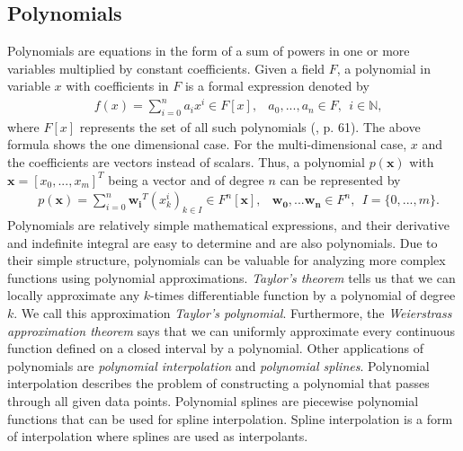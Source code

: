 \subsection{Polynomials}
Polynomials are equations in the form of a sum of powers in one or more variables multiplied by constant coefficients. Given a field $F$, a polynomial in variable $x$ with coefficients in $F$ is a formal expression denoted by
\begin{align*}
  &f(x) = \sum_{i=0}^{n} a_i x^i \in F[x], &a_0, ..., a_n \in F, \ \ i \in \mathbb{N},
\end{align*}
where $F[x]$ represents the set of all such polynomials (\cite{fischer2014}, p. 61). The above formula shows the one dimensional case. For the multi-dimensional case, $x$ and the coefficients are vectors instead of scalars. Thus, a polynomial $p(\mathbf{x})$ with $\mathbf{x} = [x_0, ..., x_m]^T$ being a vector and of degree $n$ can be represented by
\begin{align*}
  &p(\mathbf{x}) = \sum_{i=0}^{n} \mathbf{w_i}^T (x_k^i)_{k \in I} \in F^n[\mathbf{x}], &\mathbf{w_0}, ... \mathbf{w_n} \in F^n, \ \ I = \{0, ..., m\}.
\end{align*}
Polynomials are relatively simple mathematical expressions, and their derivative and indefinite integral are easy to determine and are also polynomials. Due to their simple structure, polynomials can be valuable for analyzing more complex functions using polynomial approximations. \textit{Taylor's theorem} tells us that we can locally approximate any $k$-times differentiable function by a polynomial of degree $k$. We call this approximation \textit{Taylor's polynomial}. Furthermore, the \textit{Weierstrass approximation theorem} says that we can uniformly approximate every continuous function defined on a closed interval by a polynomial. Other applications of polynomials are \textit{polynomial interpolation} and \textit{polynomial splines}. Polynomial interpolation describes the problem of constructing a polynomial that passes through all given data points. Polynomial splines are piecewise polynomial functions that can be used for spline interpolation. Spline interpolation is a form of interpolation where splines are used as interpolants.

